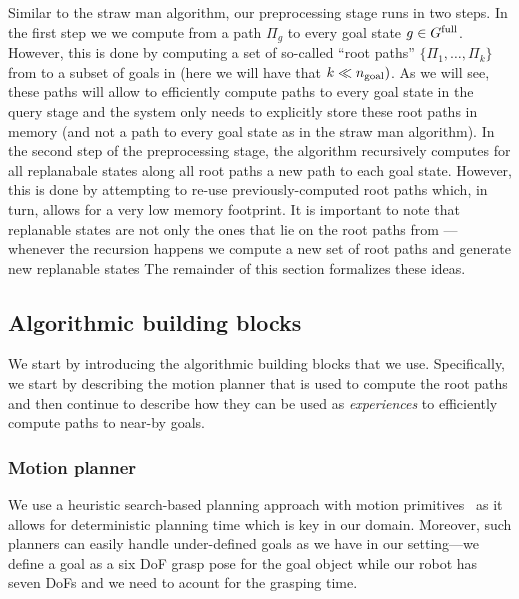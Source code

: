 \documentclass[conference]{IEEEtran}
\begin{document}
Similar to the straw man algorithm, our preprocessing stage runs in two steps.
In the first step we we compute from \Shome a path $\Pi_g$ to every goal state $ g \in G^{\textrm{full}}$. However, this is done by computing a set of so-called ``root paths'' $\{\Pi_1, \ldots, \Pi_k \}$ from \Shome to a subset of goals in \Gfull (here we will have that $k \ll n_{\rm goal})$. 
As we will see, these paths will allow to efficiently compute paths to every goal state in the query stage and the system only needs to explicitly store these root paths in memory (and not a path to every goal state as in the straw man algorithm).
%
In the second step of the preprocessing stage, the algorithm recursively computes for all replanabale states along all root paths a new path to each goal state. However, this is done by attempting to re-use previously-computed root paths which, in turn, allows for a very low memory footprint.
%
It is important to note that replanable states are not only the ones that lie on the root paths from \Shome---whenever the recursion happens we compute a new set of root paths and generate new replanable states
%
The remainder of this section formalizes these ideas.

\subsection{Algorithmic building blocks}
We start by introducing the algorithmic building blocks that we use.
Specifically, we start by describing the motion planner that is used to compute the root paths 
and then continue to describe how they can be used as \emph{experiences} to efficiently compute paths to near-by goals.
\subsubsection{Motion planner}
We use a heuristic search-based planning approach with motion primitives~\cite{}
as it allows for deterministic planning time which is key in our domain.
Moreover, such planners can easily handle under-defined goals as we have in our setting---we define a goal as a six DoF grasp pose for the goal object while our robot has seven DoFs and we need to acount for the grasping time.
\end{document}

